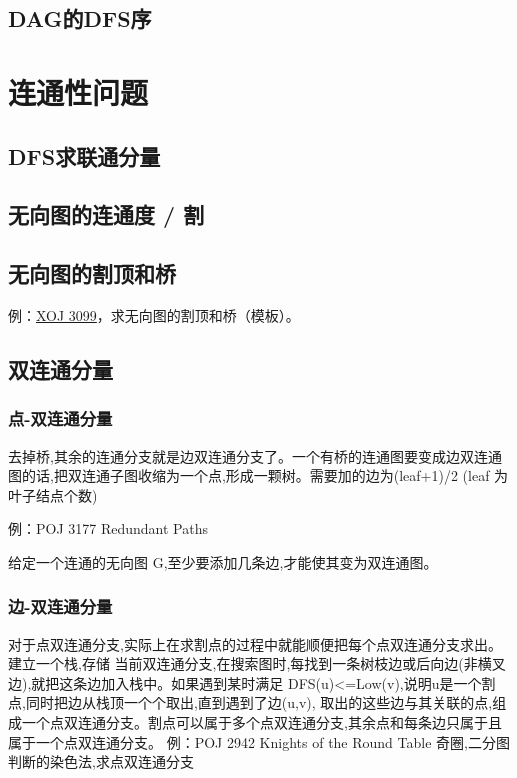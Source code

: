 \subsection{DAG的DFS序}



\section{连通性问题}
\subsection{DFS求联通分量}


\subsection{无向图的连通度 / 割}


\subsection{无向图的割顶和桥}

例：\href{https://xoj.red/problems/show/3099}{XOJ 3099}，求无向图的割顶和桥（模板）。



\subsection{双连通分量}
\subsubsection{点-双连通分量}
去掉桥,其余的连通分支就是边双连通分支了。一个有桥的连通图要变成边双连通图的话,把双连通子图收缩为一个点,形成一颗树。需要加的边为(leaf+1)/2 (leaf 为叶子结点个数) 

例：POJ 3177 Redundant Paths 

给定一个连通的无向图 G,至少要添加几条边,才能使其变为双连通图。


\subsubsection{边-双连通分量}
对于点双连通分支,实际上在求割点的过程中就能顺便把每个点双连通分支求出。建立一个栈,存储 当前双连通分支,在搜索图时,每找到一条树枝边或后向边(非横叉边),就把这条边加入栈中。如果遇到某时满足 DFS(u)<=Low(v),说明u是一个割点,同时把边从栈顶一个个取出,直到遇到了边(u,v), 取出的这些边与其关联的点,组成一个点双连通分支。割点可以属于多个点双连通分支,其余点和每条边只属于且属于一个点双连通分支。 
例：POJ 2942 Knights of the Round Table
奇圈,二分图判断的染色法,求点双连通分支



